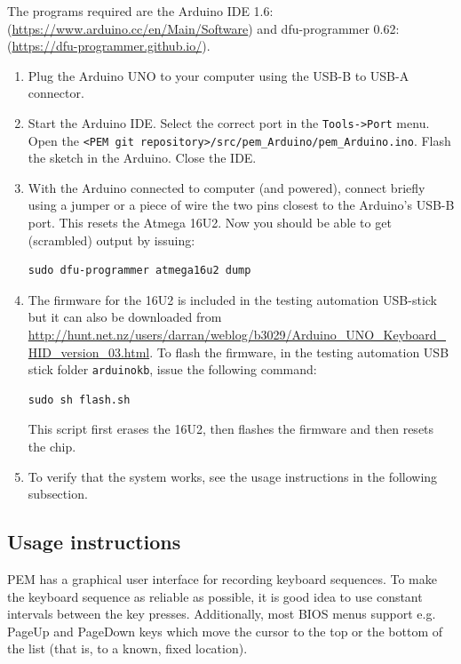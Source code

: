 \documentclass[a4paper,11pt]{article}
\newcommand{\cmd}[1]{\texttt{#1}}
\begin{document}
The programs required are the Arduino IDE 1.6: (\url{https://www.arduino.cc/en/Main/Software}) and dfu-programmer 0.62: (\url{https://dfu-programmer.github.io/}).

\begin{enumerate}
\item Plug the Arduino UNO to your computer using the USB-B to USB-A connector.

\item Start the Arduino IDE. Select the correct port in the \cmd{Tools->Port} menu. Open the \cmd{<PEM git repository>/src/pem\_Arduino/pem\_Arduino.ino}. Flash the sketch in the Arduino. Close the IDE.

\item With the Arduino connected to computer (and powered), connect briefly using a jumper or a piece of wire the two pins closest to the Arduino's USB-B port. This resets the Atmega 16U2. Now you should be able to get (scrambled) output by issuing:
\begin{lstlisting}
sudo dfu-programmer atmega16u2 dump
\end{lstlisting}

\item The firmware for the 16U2 is included in the testing automation USB-stick but it can also be downloaded from \url{http://hunt.net.nz/users/darran/weblog/b3029/Arduino_UNO_Keyboard_HID_version_03.html}. To flash the firmware, in the testing automation USB stick folder \cmd{arduinokb}, issue the following command:
\begin{lstlisting}
sudo sh flash.sh
\end{lstlisting}
This script first erases the 16U2, then flashes the firmware and then resets the chip.

\item To verify that the system works, see the usage instructions in the following subsection.
\end{enumerate}

\subsection{Usage instructions}
PEM has a graphical user interface for recording keyboard sequences. To make the keyboard sequence as reliable as possible, it is good idea to use constant intervals between the key presses. Additionally, most BIOS menus support e.g. PageUp and PageDown keys which move the cursor to the top or the bottom of the list (that is, to a known, fixed location).
\end{document}
